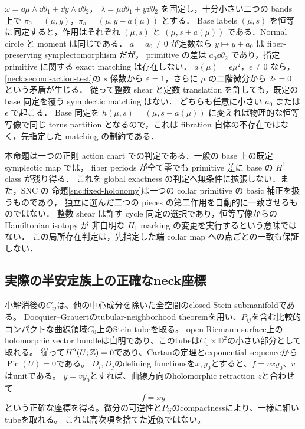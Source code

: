 \begin{example}
\label{neck:normal-action-counterexample}
$\omega=\dd\mu\wedge\dd\theta_1+\dd y\wedge\dd\theta_2$，
$\lambda=\mu\dd\theta_1+y\dd\theta_2$ を固定し，十分小さい二つの bands 上で
$\pi_0=(\mu,y)$，$\pi_a=(\mu,y-a(\mu))$ とする．
Base labels $(\mu,s)$ を恒等に同定すると，作用はそれぞれ $(\mu,s)$ と
$(\mu,s+a(\mu))$ である．Normal circle と moment は同じである．
$a=a_0\ne0$ が定数なら $y\mapsto y+a_0$ は fiber-preserving symplectomorphism だが，
primitive の差は $a_0\dd\theta_2$ であり，指定 primitive に関する exact matching は存在しない．
$a(\mu)=\epsilon\mu^2$，$\epsilon\ne0$ なら，\eqref{neck:second-action-test}の $s$ 係数から
$\varepsilon=1$，さらに $\mu$ の二階微分から $2\epsilon=0$ という矛盾が生じる．
従って整数 shear と定数 translation を許しても，既定の base 同定を覆う symplectic matching はない．
どちらも任意に小さい $a_0$ または $\epsilon$ で起こる．
Base 同定を $h(\mu,s)=(\mu,s-a(\mu))$ に変えれば物理的な恒等写像で同じ torus partition
となるので，これは fibration 自体の不存在ではなく，先指定した matching の制約である．
\end{example}

本命題は一つの正則 action chart での判定である．一般の base 上の既定 symplectic map では，
fiber periods が全て零でも primitive 差に base の $H^1$ class が残り得る．
これを global exactness の判定へ無条件に拡張しない．また，SNC の
命題\ref{snc:fixed-holonomy}は一つの collar primitive の basic 補正を扱うものであり，
独立に選んだ二つの pieces の第二作用を自動的に一致させるものではない．
整数 shear は許す cycle 同定の選択であり，恒等写像からの Hamiltonian isotopy が
非自明な $H_1$ marking の変更を実行するという意味ではない．
この局所存在判定は，先指定した端 collar map への点ごとの一致も保証しない．

\subsection{実際の半安定族上の正確なneck座標}
小解消後の$C_{ij}^{\circ}$は、他の中心成分を除いた全空間のclosed Stein submanifoldである。
Docquier--Grauertのtubular-neighborhood theoremを用い、$P_{ij}$を含む比較的コンパクトな曲線領域$C_0$上のStein tubeを取る\cite{Forstneric}。
open Riemann surface上のholomorphic vector bundleは自明であり、このtubeは$C_0\times\mathbb D^2$の小さい部分として取れる。
従って$H^2(U;\mathbb Z)=0$であり、Cartanの定理とexponential sequenceから$\operatorname{Pic}(U)=0$である。
$D_i,D_j$のdefining functionsを$x,y_0$とすると、$f=vxy_0$、$v$はunitである。
$y=vy_0$とすれば、曲線方向のholomorphic retraction $z$と合わせて
\[
f=xy
\]
という正確な座標を得る。微分の可逆性と$P_{ij}$のcompactnessにより、一様に細いtubeを取れる。
これは高次項を捨てた近似ではない。

